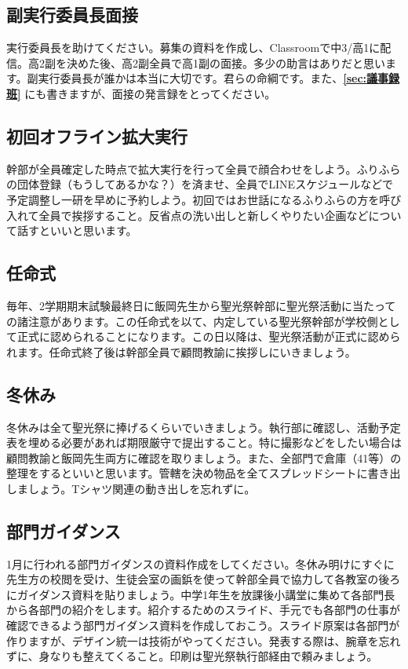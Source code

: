 \documentclass[dvipdfmx,jb5]{jreport}
\begin{document}
\subsection{副実行委員長面接}
実行委員長を助けてください。募集の資料を作成し、Classroomで中3/高1に配信。高2副を決めた後、高2副全員で高1副の面接。多少の助言はありだと思います。副実行委員長が誰かは本当に大切です。君らの命綱です。また、{\bf \ref{sec:議事録班}} にも書きますが、面接の発言録をとってください。

\subsection{初回オフライン拡大実行}
幹部が全員確定した時点で拡大実行を行って全員で顔合わせをしよう。ふりふらの団体登録（もうしてあるかな？）を済ませ、全員でLINEスケジュールなどで予定調整し一研を早めに予約しよう。初回ではお世話になるふりふらの方を呼び入れて全員で挨拶すること。反省点の洗い出しと新しくやりたい企画などについて話すといいと思います。

\subsection{任命式}
毎年、2学期期末試験最終日に飯岡先生から聖光祭幹部に聖光祭活動に当たっての諸注意があります。この任命式を以て、内定している聖光祭幹部が学校側として正式に認められることになります。この日以降は、聖光祭活動が正式に認められます。任命式終了後は幹部全員で顧問教諭に挨拶しにいきましょう。

\subsection{冬休み}
冬休みは全て聖光祭に捧げるくらいでいきましょう。執行部に確認し、活動予定表を埋める必要があれば期限厳守で提出すること。特に撮影などをしたい場合は顧問教諭と飯岡先生両方に確認を取りましょう。また、全部門で倉庫（41等）の整理をするといいと思います。管轄を決め物品を全てスプレッドシートに書き出しましょう。Tシャツ関連の動き出しを忘れずに。

\subsection{部門ガイダンス}
1月に行われる部門ガイダンスの資料作成をしてください。冬休み明けにすぐに先生方の校閲を受け、生徒会室の画鋲を使って幹部全員で協力して各教室の後ろにガイダンス資料を貼りましょう。中学1年生を放課後小講堂に集めて各部門長から各部門の紹介をします。紹介するためのスライド、手元でも各部門の仕事が確認できるよう部門ガイダンス資料を作成しておこう。スライド原案は各部門が作りますが、デザイン統一は技術がやってください。発表する際は、腕章を忘れずに、身なりも整えてくること。印刷は聖光祭執行部経由で頼みましょう。
\end{document}
